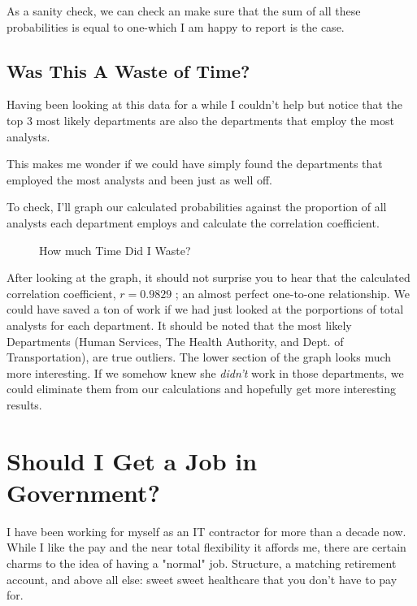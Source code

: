 \documentclass[letterpaper]{article}
\theoremstyle{definition}
\begin{document}
As a sanity check, we can check an make sure that the sum of all these probabilities is
equal to one-which I am happy to report is the case. 

\subsection{Was This A Waste of Time?}

Having been looking at this data for a while I couldn't help but notice that the top 3
most likely departments are also the departments that employ the most analysts. 

This makes me wonder if we could have simply found the departments that employed the most
analysts and been just as well off. 

To check, I'll graph our calculated probabilities against the proportion of all analysts
each department employs and calculate the correlation coefficient.

    
\begin{figure}[H]
	\caption{How much Time Did I Waste?}
	\label{fig:2}
	\begin{center}
	\end{center}
\end{figure}
    
After looking at the graph, it should not surprise you to hear that the calculated
correlation coefficient, $r=0.9829$ ; an almost perfect one-to-one relationship. We could
have saved a ton of work if we had just looked at the porportions of total analysts for
each department. It should be noted that the most likely Departments (Human Services, The
Health Authority, and Dept. of Transportation), are true outliers. The lower section of
the graph looks much more interesting. If we somehow knew she \emph{didn't} work in those
departments, we could eliminate them from our calculations and hopefully get more
interesting results.

    \hypertarget{now-its-all-about-me}{%
\section{Should I Get a Job in Government?}\label{now-its-all-about-me}}

I have been working for myself as an IT contractor for more than a decade now. While I
like the pay and the near total flexibility it affords me, there are certain charms to the
idea of having a "normal" job. Structure, a matching retirement account, and above all
else: sweet sweet healthcare that you don't have to pay for.
\end{document}
